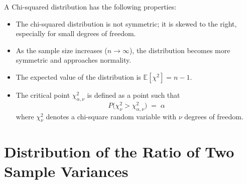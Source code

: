 \documentclass[twoside]{book}
\begin{document}
\begin{center}
\end{center}

A Chi-squared distribution has the following properties:
\begin{itemize}
    \item The chi-squared distribution is not symmetric; it is skewed to the right, especially for small degrees of freedom.
    \item As the sample size increases (\( n \to \infty \)), the distribution becomes more symmetric and approaches normality.
    \item The expected value of the distribution is \( \mathbb{E}[\chi^2] = n-1 \).
    \item The critical point \(\chi^2_{\alpha,\nu}\) is defined as a point such that
\[
P\bigl(\chi^2_\nu > \chi^2_{\alpha,\nu}\bigr) \;=\;\alpha
\]
where \(\chi^2_\nu\) denotes a chi-square random variable with \(\nu\) degrees of freedom.
\end{itemize}

\section{Distribution of the Ratio of Two Sample Variances}
\end{document}
